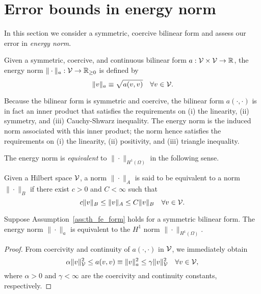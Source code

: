 \section{Error bounds in energy norm}
In this section we consider a symmetric, coercive bilinear form and assess our error in \emph{energy norm}.
\begin{definition}
  Given a symmetric, coercive, and continuous bilinear form $a: \mathcal{V} \times \mathcal{V} \to \mathbb{R}$, the energy norm $\| \cdot \|_a : \mathcal{V} \to \mathbb{R}_{\geq 0}$ is defined by
  \begin{equation*}
    \| v \|_a \equiv \sqrt{a(v,v)} \quad \forall v \in \mathcal{V}.
  \end{equation*}
\end{definition}
Because the bilinear form is symmetric and coercive, the bilinear form $a(\cdot,\cdot)$ is in fact an inner product that satisfies the requirements on (i) the linearity, (ii) symmetry, and (iii) Cauchy-Shwarz inequality.  The energy norm is the induced norm associated with this inner product; the norm hence satisfies the requirements on (i) the linearity, (ii) positivity, and (iii) triangle inequality.

The energy norm is \emph{equivalent} to $\| \cdot \|_{H^1(\Omega)}$ in the following sense.
\begin{definition}
  Given a Hilbert space $\mathcal{V}$, a norm $\| \cdot \|_A$ is said to be equivalent to a norm $\| \cdot \|_B$ if there exist $c > 0$ and $C < \infty$ such that
  \begin{equation*}
    c \| v \|_{B} \leq \| v \|_A \leq C \| v \|_{B} \quad \forall v \in \mathcal{V}.
  \end{equation*}
\end{definition}
\begin{lemma}
  Suppose Assumption~\ref{ass:th_fe_form} holds for a symmetric bilinear form.  The energy norm $\| \cdot \|_a$ is equivalent to the $H^1$ norm $\| \cdot \|_{H^1(\Omega)}$.
  \begin{proof}
    From coercivity and continuity of $a(\cdot,\cdot)$ in $\mathcal{V}$, we immediately obtain
    \begin{equation*}
      \alpha \| v \|_{\mathcal{V}}^2 \leq a(v,v) \equiv \| v \|_a^2 \leq \gamma \| v \|_{\mathcal{V}}^2 \quad \forall v \in \mathcal{V},
    \end{equation*}
    where $\alpha > 0$ and $\gamma < \infty$ are the coercivity and continuity constants, respectively. %
  \end{proof}
\end{lemma}

